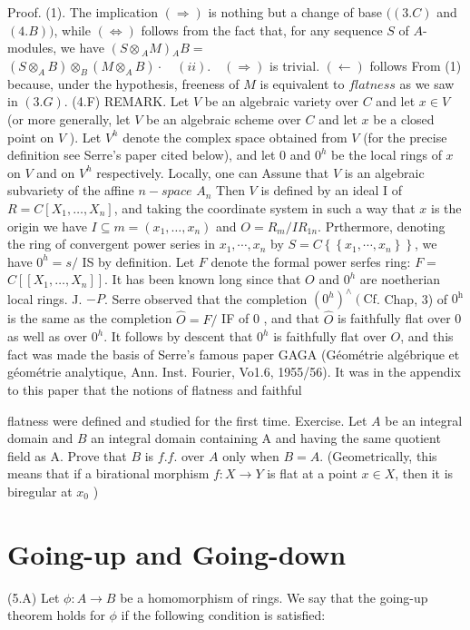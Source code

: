 Proof. (1). The implication $(\Rightarrow)$ is nothing but a change of base $((3 . C)$ and $(4 . B))$, while $(\Leftrightarrow)$ follows from the fact that, for any sequence $S$ of $A$-modules, we have $\left(S \otimes{ }_{A} M\right){ }_{A} B=$ $\left(S \otimes_{A} B\right) \otimes_{B}\left(M \otimes_{A} B\right) \cdot \quad(i i) . \quad(\Rightarrow)$ is trivial. $(\leftarrow)$ follows From (1) because, under the hypothesis, freeness of $M$ is equivalent to $f l a t n e s s$ as we saw in $(3 . G)$. (4.F) REMARK. Let $V$ be an algebraic variety over $C$ and let $x \in V$ (or more generally, let $V$ be an algebraic scheme over $C$ and let $x$ be a closed point on $V$ ). Let $V^{h}$ denote the complex space obtained from $V$ (for the precise definition see Serre's paper cited below), and let 0 and $0^{h}$ be the local rings of $x$ on $V$ and on $V^{h}$ respectively. Locally, one can Assune that $V$ is an algebraic subvariety of the affine $n-s p a c e$ $A_{n}$ Then $V$ is defined by an ideal I of $R=C\left[X_{1}, \ldots, X_{n}\right]$, and taking the coordinate system in such a way that $x$ is the origin we have $I \subseteq m=\left(x_{1}, \ldots, x_{n}\right)$ and $O=R_{m} / I R_{1 n}$. Prthermore, denoting the ring of convergent power series in $x_{1}, \cdots, x_{n}$ by $S=C\left\{\left\{x_{1}, \cdots, x_{n}\right\}\right\}$, we have $0^{h}=s /$ IS by definition. Let $F$ denote the formal power serfes ring: $F=$ $C\left[\left[X_{1}, \ldots, X_{n}\right]\right]$. It has been known long since that $O$ and $0^{h}$ are noetherian local rings. J. $-P$. Serre observed that the completion $\left(0^{h}\right)^{\wedge}\left(\mathrm{Cf}\right.$. Chap, 3) of $0^{\mathrm{h}}$ is the same as the completion $\hat{O}=F /$ IF of 0 , and that $\hat{O}$ is faithfully flat over 0 as well as over $0^{h}$. It follows by descent that $0^{h}$ is faithfully flat over $O$, and this fact was made the basis of Serre's famous paper GAGA (Géométrie algébrique et géométrie analytique, Ann. Inst. Fourier, Vo1.6, 1955/56). It was in the appendix to this paper that the notions of flatness and faithful

flatness were defined and studied for the first time. Exercise. Let $A$ be an integral domain and $B$ an integral domain containing A and having the same quotient field as A. Prove that $B$ is $f . f$. over $A$ only when $B=A$. (Geometrically, this means that if a birational morphism $f: X \rightarrow Y$ is flat at a point $x \in X$, then it is biregular at $x_{0}$ )

\section{Going-up and Going-down}
(5.A) Let $\phi: A \rightarrow B$ be a homomorphism of rings. We say that the going-up theorem holds for $\phi$ if the following condition is satisfied:


